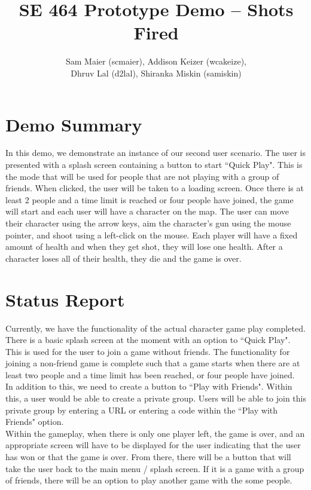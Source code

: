 \documentclass[11pt, oneside]{article}   	%
\title{SE 464 Prototype Demo -- Shots Fired}
\author{Sam Maier (scmaier), Addison Keizer (wcakeize), \\Dhruv Lal (d2lal), Shiranka Miskin (samiskin)}
\begin{document}
\maketitle


\clearpage

\section{Demo Summary}
\hspace*{5mm}In this demo, we demonstrate an instance of our second user scenario. The user
is presented with a splash screen containing a button to start ``Quick Play".
This is the mode that will be used for people that are not playing with a group
of friends. When clicked, the user will be taken to a loading screen.
Once there is at least 2 people and a time limit is
reached or four people have joined, the game will start and each user will have
a character on the map. The user can move their character using the arrow keys,
aim the character's gun using the mouse pointer, and shoot using a left-click
on the mouse. Each player will have a fixed amount of health and when they get
shot, they will lose one health. After a character loses all of their health,
they die and the game is over.

\section{Status Report}
\hspace*{5mm}
Currently, we have the functionality of the actual character game play completed. There
is a basic splash screen at the moment with an option to ``Quick Play". This is
used for the user to join a game without friends. The functionality for joining
a non-friend game is complete such that a game starts when there are at least
two people and a time limit has been reached, or four people have joined.\\

In addition to this, we need to create a button to ``Play with Friends". Within
this, a user would be able to create a private group. Users will be able to
join this private group by entering a URL or entering a code within the ``Play
with Friends" option.\\

Within the gameplay, when there is only one player left, the game is over, and an appropriate screen
will have to be displayed for the user indicating that the user has won or that
the game is over. From there, there will be a button that will take the user
back to the main menu / splash screen. If it is a game with a group of friends,
there will be an option to play another game with the some people.\\
\end{document}
